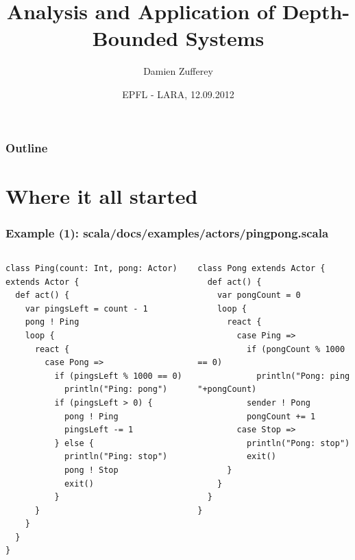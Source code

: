 \documentclass{beamer}
\title[Analysis and Application of DBS]{Analysis and Application of Depth-Bounded Systems}
\author{Damien Zufferey}
\institute{
  IST Austria
}
\date{EPFL - LARA, 12.09.2012}
\begin{document}
\frame[plain]{\titlepage}

%
%

\begin{frame}
  \frametitle{Outline}
  \tableofcontents
\end{frame}


\section{Where it all started}

\begin{frame}[fragile]
  \frametitle{Example (1): scala/docs/examples/actors/pingpong.scala}

  \begin{columns}
    \column{6cm}
{\tiny
\begin{verbatim}
class Ping(count: Int, pong: Actor) extends Actor {
  def act() {
    var pingsLeft = count - 1
    pong ! Ping
    loop {
      react {
        case Pong =>
          if (pingsLeft % 1000 == 0)
            println("Ping: pong")
          if (pingsLeft > 0) {
            pong ! Ping
            pingsLeft -= 1
          } else {
            println("Ping: stop")
            pong ! Stop
            exit()
          }
      }
    }
  }
}
\end{verbatim}
}

    \column{5cm}
{\tiny
\begin{verbatim}
class Pong extends Actor {
  def act() {
    var pongCount = 0
    loop {
      react {
        case Ping =>
          if (pongCount % 1000 == 0)
            println("Pong: ping "+pongCount)
          sender ! Pong
          pongCount += 1
        case Stop =>
          println("Pong: stop")
          exit()
      }
    }
  }
}
\end{verbatim}
}
  \end{columns}
\end{frame}
\end{document}
